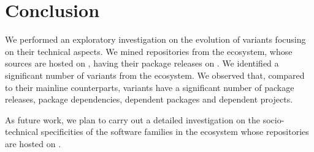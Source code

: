 \section{Conclusion}
\label{sec:conclusion}
We performed an exploratory investigation on the evolution of variants focusing on their technical aspects. We mined repositories from the \js ecosystem, whose sources are hosted on \gh, having their package releases on \np.
We identified a significant number of variants from the \js ecosystem. We observed that, compared to their mainline counterparts, variants have a significant number of package releases, package dependencies, dependent packages and dependent projects.

As future work, we plan to carry out a detailed investigation on the socio-technical specificities of the software families in the \js ecosystem whose repositories are hosted on \gh. 

